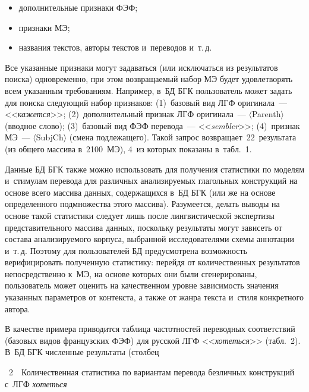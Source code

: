   \begin{multicols}{2}

\begin{itemize}
\item дополнительные признаки ФЭФ;
\item признаки МЭ;
\item названия текстов, авторы текстов и~переводов и~т.\,д.
\end{itemize}

  Все указанные признаки могут задаваться (или исключаться из результатов 
поиска) одновременно, при этом возвращаемый набор МЭ будет удовлетворять 
всем указанным требованиям. Например, в~БД БГК пользователь может задать 
для поиска следующий набор признаков: (1)~базовый вид ЛГФ оригинала~--- 
<<\textit{кажется}>>; (2)~дополнительный признак ЛГФ оригинала~--- 
$\langle$Parenth$\rangle$ (вводное слово); (3)~базовый вид ФЭФ перевода~--- 
<<\textit{sembler}>>; (4)~признак МЭ~--- $\langle${SubjCh}$\rangle$ (смена 
подлежащего). Такой запрос возвращает~22~результата (из общего массива 
в~2100~МЭ), 4~из которых показаны в~табл.~1.
  
  
  
    
  Данные БД БГК также можно использовать для получения статистики по 
моделям и~стимулам перевода для различных анализируемых глагольных 
конструкций на основе всего массива данных, содержащихся в~БД БГК (или же 
на основе определенного подмножества этого массива). Разумеется, делать 
выводы на основе такой статистики следует лишь после лингвистической 
экспертизы представительного массива данных, поскольку результаты могут 
зависеть от состава анализируемого корпуса, выбранной исследователями 
схемы аннотации и~т.\,д. Поэтому для пользователей БД предусмотрена 
возможность верифицировать полученную статистику: перейдя от 
количественных результатов непосредственно к~МЭ, на основе которых они 
были сгенерированы, пользователь может оценить на качественном уровне 
зависимость значения указанных параметров от контекста, а также от жанра 
текста и~стиля конкретного автора.
  
  В качестве примера приводится таблица частотностей переводных 
соответствий (базовых видов французских ФЭФ) для русской ЛГФ 
<<\textit{хотеться}>>
 (табл.~2). В~БД БГК численные результаты (столбец\linebreak\vspace*{-12pt}

\noindent
{{\tablename~2}\ \ \small{Количественная статистика по вариантам перевода безличных конструкций с~ЛГФ 
\textit{хотеться}}}


\end{multicols}
